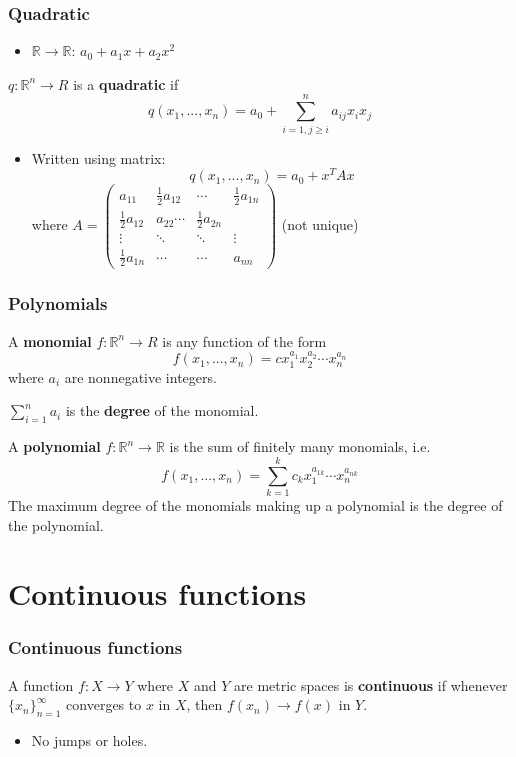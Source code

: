 \documentclass[compress]{beamer}
\def\R{\mathbb{R}}
\newcommand{\seq}[1]{\{{#1}_n \}_{n=1}^\infty }
\renewcommand{\to}{{\rightarrow}}
\begin{document}
\begin{frame}
  \frametitle{Quadratic}
  \begin{itemize}
  \item $\R \to \R$:  $a_0 + a_1 x + a_2 x^2$
  \end{itemize}
  \begin{definition}
    $q:\R^n \to R$ is a \textbf{quadratic} if 
    \[ q(x_1, ..., x_n) = a_0 + \sum_{i=1, j \geq i}^n a_{ij} x_i x_j \]
  \end{definition}
  \begin{itemize}
  \item Written using matrix:
    \[ q(x_1,..., x_n) = a_0 + x^T A x \]
    where $A = \begin{pmatrix} a_{11} & \frac{1}{2} a_{12} & \cdots &
      \frac{1}{2} a_{1n} \\
      \frac{1}{2} a_{12} & a_{22} \cdots & \frac{1}{2} a_{2n} \\
      \vdots & \ddots & \ddots & \vdots \\
      \frac{1}{2} a_{1n} & \cdots & \cdots & a_{nn}
    \end{pmatrix}$ (not unique)
  \end{itemize}
\end{frame}

\begin{frame}
  \frametitle{Polynomials}
  \begin{definition}
    A \textbf{monomial} $f:\R^n \to R$ is any function of the form
    \[ f(x_1, ..., x_n) = c x_1^{a_1} x_2^{a_2} \cdots x_n^{a_n} \]
    where $a_i$ are nonnegative integers. 
    
    $\sum_{i=1}^n a_i$ is the \textbf{degree} of the monomial. 

    A \textbf{polynomial} $f:\R^n \to \R$ is the sum of finitely many
    monomials, i.e.
    \[ f(x_1, ..., x_n) = \sum_{k=1}^k c_k x_1^{a_{1k}}\cdots
    x_n^{a_{nk}} \]
    The maximum degree of the monomials making up a polynomial is the
    degree of the polynomial.
  \end{definition}
\end{frame}

\section{Continuous functions}

\begin{frame}
  \frametitle{Continuous functions}
  \begin{definition}
    A function $f:X \to Y$ where $X$ and $Y$ are metric spaces is
    \textbf{continuous} if whenever $\seq{x}$ converges to $x$ in $X$,
    then $f(x_n) \to f(x)$ in $Y$. 
  \end{definition}
  \begin{itemize}
  \item No jumps or holes.
  \end{itemize}
\end{frame}
\end{document}
